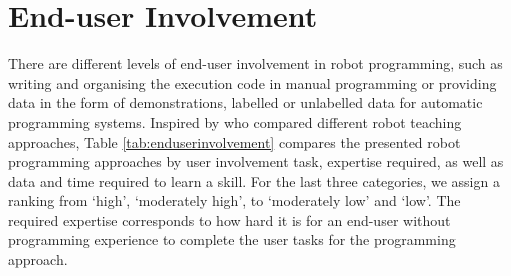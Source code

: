 



\section{End-user Involvement}\label{sssec:End-User Involvement}
There are different levels of end-user involvement in robot programming, such as writing and organising the execution code in manual programming or providing data in the form of demonstrations, labelled or unlabelled data for automatic programming systems. %
Inspired by \cite{kormushev2013reinforcement} who compared different robot teaching approaches,
Table \ref{tab:enduserinvolvement} compares the presented robot programming approaches by user involvement task, expertise required, as well as data and time required to learn a skill.
For the last three categories, we assign a ranking from `high', `moderately high', to `moderately low' and `low'.
The required expertise corresponds to how hard it is for an end-user without programming experience to complete the user tasks for the programming approach.

